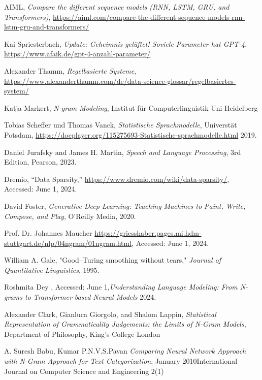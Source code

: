\documentclass[12pt]{article}
\begin{document}
\clearpage
\begin{thebibliography}{9}

	AIML, \textit{Compare the different sequence models (RNN, LSTM, GRU, and Transformers)}, \url{https://aiml.com/compare-the-different-sequence-models-rnn-lstm-gru-and-transformers/}

	Kai Spriesterbach, \textit{Update: Geheimnis gelüftet! Soviele Parameter hat GPT-4}, \url{https://www.afaik.de/gpt-4-anzahl-parameter/}

	Alexander Thamm, \textit{Regelbasierte Systeme}, \url{https://www.alexanderthamm.com/de/data-science-glossar/regelbasiertes-system/}

	Katja Markert, \textit{N-gram Modeling}, Institut für Computerlinguistik Uni Heidelberg

	Tobias Scheffer und Thomas Vanck, \textit{Statistische Sprachmodelle}, Universtät Potsdam, \url{https://docplayer.org/115275693-Statistische-sprachmodelle.html} 2019.

	Daniel Jurafsky and James H. Martin, \textit{Speech and Language Processing}, 3rd Edition, Pearson, 2023.

	Dremio, ``Data Sparsity,'' \url{https://www.dremio.com/wiki/data-sparsity/}, Accessed: June 1, 2024.

	David Foster, \textit{Generative Deep Learning: Teaching Machines to Paint, Write, Compose, and Play}, O'Reilly Media, 2020.

	Prof. Dr. Johannes Maucher \url{https://griesshaber.pages.mi.hdm-stuttgart.de/nlp/04ngram/01ngram.html}, Accessed: June 1, 2024.

	William A. Gale, "Good–Turing smoothing without tears," \textit{Journal of Quantitative Linguistics}, 1995.

	Roshmita Dey , Accessed: June 1,\textit{Understanding Language Modeling: From N-grams to Transformer-based Neural Models} 2024.

	Alexander Clark, Gianluca Giorgolo, and Shalom Lappin, \textit{Statistical Representation of Grammaticality Judgements: the Limits of
		N-Gram Models}, Department of Philosophy, King’s College London

	A. Suresh Babu, Kumar P.N.V.S.Pavan
	\textit{Comparing Neural Network Approach with N-Gram Approach for Text Categorization},     January 2010International Journal on Computer Science and Engineering 2(1)


\end{thebibliography}
\end{document}
